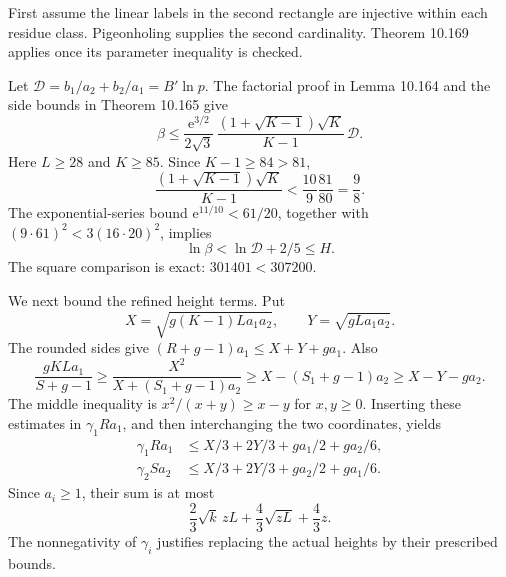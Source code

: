 \documentclass[
  11pt,
  a4paper,
]{article}
\begin{document}
First assume the linear labels in the second rectangle are injective
within each residue class. Pigeonholing supplies the second cardinality.
Theorem 10.169 applies once its parameter inequality is checked.

Let \(\mathcal D=b_1/a_2+b_2/a_1=B'\ln p\). The factorial proof in Lemma
10.164 and the side bounds in Theorem 10.165 give \[
\beta\le\frac{\mathrm e^{3/2}}{2\sqrt3}\,
\frac{(1+\sqrt{K-1})\sqrt K}{K-1}\,\mathcal D.
\tag{10.611}
\] Here \(L\ge28\) and \(K\ge85\). Since \(K-1\ge84>81\), \[
\frac{(1+\sqrt{K-1})\sqrt K}{K-1}
<\frac{10}{9}\frac{81}{80}=\frac98.
\tag{10.612}
\] The exponential-series bound \(\mathrm e^{11/10}<61/20\), together
with \((9\cdot61)^2<3(16\cdot20)^2\), implies \[
\ln\beta<\ln\mathcal D+2/5\le H.
\tag{10.613}
\] The square comparison is exact: \(301401<307200\).

We next bound the refined height terms. Put \[
X=\sqrt{g(K-1)La_1a_2},\qquad Y=\sqrt{gLa_1a_2}.
\tag{10.614}
\] The rounded sides give \((R+g-1)a_1\le X+Y+ga_1\). Also \[
\frac{gKLa_1}{S+g-1}
\ge\frac{X^2}{X+(S_1+g-1)a_2}
\ge X-(S_1+g-1)a_2
\ge X-Y-ga_2.
\tag{10.615}
\] The middle inequality is \(x^2/(x+y)\ge x-y\) for \(x,y\ge0\).
Inserting these estimates in \(\gamma_1Ra_1\), and then interchanging
the two coordinates, yields \[
\begin{aligned}
\gamma_1Ra_1&\le X/3+2Y/3+ga_1/2+ga_2/6,\\
\gamma_2Sa_2&\le X/3+2Y/3+ga_2/2+ga_1/6.
\end{aligned}
\tag{10.616}
\] Since \(a_i\ge1\), their sum is at most \[
\frac23\sqrt{k}\,zL+\frac43\sqrt{zL}+\frac43z.
\tag{10.617}
\] The nonnegativity of \(\gamma_i\) justifies replacing the actual
heights by their prescribed bounds.
\end{document}
